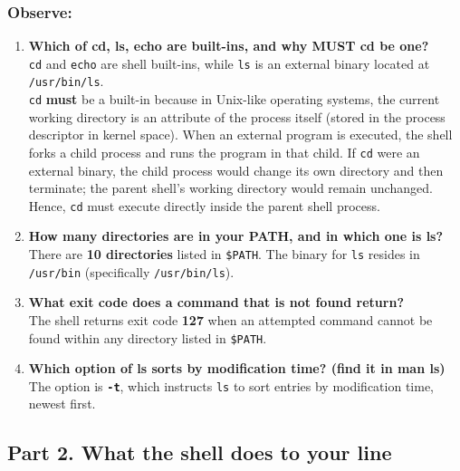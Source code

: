 \documentclass{labreport}
\begin{document}
\subsubsection*{Observe:}
\begin{enumerate}[leftmargin=*]
    \item \textbf{Which of cd, ls, echo are built-ins, and why MUST cd be one?}\\[0.2em]
    \texttt{cd} and \texttt{echo} are shell built-ins, while \texttt{ls} is an external binary located at \texttt{/usr/bin/ls}.\\
    \texttt{cd} \textbf{must} be a built-in because in Unix-like operating systems, the current working directory is an attribute of the process itself (stored in the process descriptor in kernel space). When an external program is executed, the shell forks a child process and runs the program in that child. If \texttt{cd} were an external binary, the child process would change its own directory and then terminate; the parent shell's working directory would remain unchanged. Hence, \texttt{cd} must execute directly inside the parent shell process.

    \item \textbf{How many directories are in your PATH, and in which one is ls?}\\[0.2em]
    There are \textbf{10 directories} listed in \texttt{\$PATH}. The binary for \texttt{ls} resides in \texttt{/usr/bin} (specifically \texttt{/usr/bin/ls}).

    \item \textbf{What exit code does a command that is not found return?}\\[0.2em]
    The shell returns exit code \textbf{127} when an attempted command cannot be found within any directory listed in \texttt{\$PATH}.

    \item \textbf{Which option of ls sorts by modification time? (find it in man ls)}\\[0.2em]
    The option is \textbf{\texttt{-t}}, which instructs \texttt{ls} to sort entries by modification time, newest first.
\end{enumerate}

\subsection{Part 2. What the shell does to your line}
\end{document}
